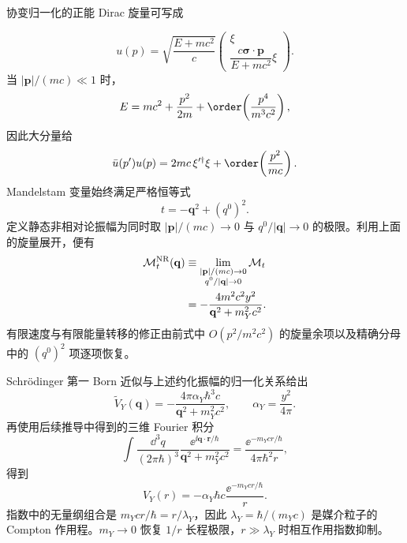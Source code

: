 \begin{derivation}
协变归一化的正能 Dirac 旋量可写成

\begin{equation*}
 u(p)=\sqrt{\frac{E+mc^2}{c}}
 \begin{pmatrix}
 \xi\\[1mm]
 \dfrac{c\boldsymbol\sigma\cdot\mathbf p}{E+mc^2}\xi
 \end{pmatrix}.
\end{equation*}
当 $|\mathbf p|/(mc)\ll1$ 时，
\begin{equation*}
 E=mc^2+\frac{p^2}{2m}+\order\!\left(\frac{p^4}{m^3c^2}\right),
\end{equation*}
因此大分量给
\begin{equation*}
 \bar u(p')u(p)
 =2mc\,\xi'^\dagger\xi
 +\order\!\left(\frac{p^2}{mc}\right).
\end{equation*}
Mandelstam 变量始终满足严格恒等式
\begin{equation*}
 t=-\mathbf q^2+(q^0)^2.
\end{equation*}
定义静态非相对论振幅为同时取 $|\mathbf p|/(mc)\to0$ 与 $q^0/|\mathbf q|\to0$ 的极限。利用上面的旋量展开，便有
\begin{align*}
 \mathcal M_t^{\rm NR}(\mathbf q)
 &\equiv
 \lim_{\substack{|\mathbf p|/(mc)\to0\\ q^0/|\mathbf q|\to0}}
 \mathcal M_t\\
 &=-\frac{4m^2c^2y^2}{\mathbf q^2+m_Y^2c^2}.
\end{align*}
有限速度与有限能量转移的修正由前式中 $O(p^2/m^2c^2)$ 的旋量余项以及精确分母中的 $(q^0)^2$ 项逐项恢复。

Schr\"odinger 第一 Born 近似与上述约化振幅的归一化关系给出
\begin{equation*}
 \widetilde V_Y(\mathbf q)
 =-\frac{4\pi\alpha_Y\hbar^3c}
 {\mathbf q^2+m_Y^2c^2},
 \qquad \alpha_Y=\frac{y^2}{4\pi}.
\end{equation*}
再使用后续推导中得到的三维 Fourier 积分
\begin{equation*}
 \int\frac{\dd^3 q}{(2\pi\hbar)^3}
 \frac{\ee^{\ii\mathbf q\cdot\mathbf r/\hbar}}
 {\mathbf q^2+m_Y^2c^2}
 =\frac{\ee^{-m_Ycr/\hbar}}{4\pi\hbar^2r},
\end{equation*}
得到
\begin{equation*}
 V_Y(r)=-\alpha_Y\hbar c\frac{\ee^{-m_Ycr/\hbar}}{r}.
\end{equation*}
指数中的无量纲组合是 $m_Ycr/\hbar=r/\lambda_Y$，因此 $\lambda_Y=\hbar/(m_Yc)$ 是媒介粒子的 Compton 作用程。$m_Y\to0$ 恢复 $1/r$ 长程极限，$r\gg\lambda_Y$ 时相互作用指数抑制。
\end{derivation}

